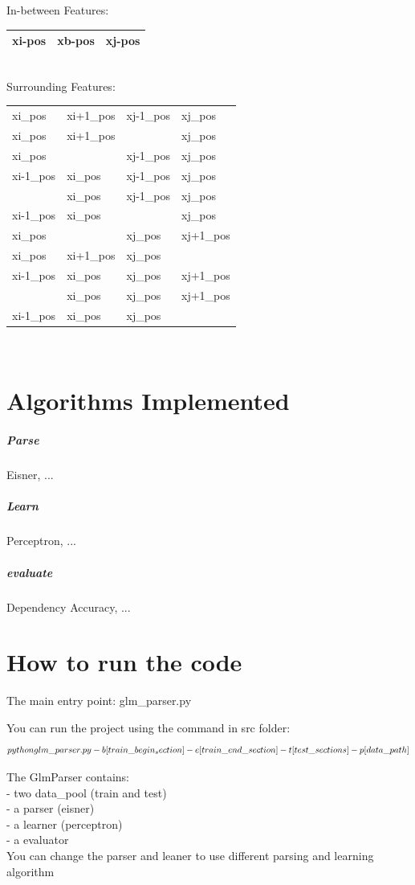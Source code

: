\documentclass[11pt]{article}
\begin{document}
In-between Features: \\

\begin{tabular}{|l l l|}
	\hline
		xi-pos& xb-pos& xj-pos \\
	\hline
\end{tabular} \\



Surrounding Features: \\

\begin{tabular}{|l l l l |}
	\hline
		xi\_pos& xi+1\_pos & xj-1\_pos & xj\_pos \\
		xi\_pos& xi+1\_pos &           & xj\_pos \\
		xi\_pos&           & xj-1\_pos & xj\_pos \\
		xi-1\_pos& xi\_pos & xj-1\_pos & xj\_pos \\
		         & xi\_pos & xj-1\_pos & xj\_pos \\
		xi-1\_pos& xi\_pos &           & xj\_pos \\
		xi\_pos&           & xj\_pos & xj+1\_pos \\
		xi\_pos& xi+1\_pos & xj\_pos &           \\
		xi-1\_pos& xi\_pos & xj\_pos & xj+1\_pos \\
		         & xi\_pos & xj\_pos & xj+1\_pos \\
		xi-1\_pos& xi\_pos & xj\_pos &           \\
	\hline
\end{tabular} \\
            


\section{Algorithms Implemented}

\subparagraph{Parse}
Eisner, ...

\subparagraph{Learn}
Perceptron, ...

\subparagraph{evaluate}
Dependency Accuracy, ...


\section{How to run the code}
The main entry point:
   glm\_parser.py

You can run the project using the command in src folder:
      $$python glm\_parser.py \\
      	-b [train\_begin_section] 
      	-e [train\_end\_section] 
      	-t [test\_sections] 
      	-p [data\_path]$$

The GlmParser contains:\\
      - two data\_pool (train and test) \\
      - a parser (eisner) \\
      - a learner (perceptron) \\
      - a evaluator \\
      
You can change the parser and leaner to use different parsing and learning algorithm
\end{document}
